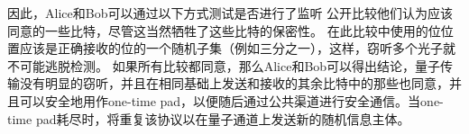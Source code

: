 因此，Alice和Bob可以通过以下方式测试是否进行了监听
公开比较他们认为应该同意的一些比特，尽管这当然牺牲了这些比特的保密性。 在此比较中使用的位位置应该是正确接收的位的一个随机子集（例如三分之一），这样，窃听多个光子就不可能逃脱检测。 如果所有比较都同意，那么Alice和Bob可以得出结论，量子传输没有明显的窃听，并且在相同基础上发送和接收的其余比特中的那些也同意，并且可以安全地用作one-time pad，以便随后通过公共渠道进行安全通信。当one-time pad耗尽时，将重复该协议以在量子通道上发送新的随机信息主体。

